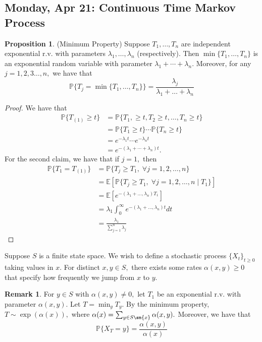 \documentclass[10pt, oneside]{article}
\newcommand{\bbP}{\mathbb{P}}
\newcommand{\bbE}{\mathbb{E}}
\theoremstyle{definition}
\newtheorem{prop}{Proposition}
\newtheorem{rem}{Remark}
\begin{document}
\newpage
\subsection*{Monday, Apr 21: Continuous Time Markov Process}
\begin{prop}
    (Minimum Property) Suppose $T_1, \dots, T_n$ are independent exponential r.v. with parameters $\lambda_1, \dots, \lambda_n$ (respectively). Then $\min\{T_1, \dots, T_n\}$ is an exponential random variable with parameter $\lambda_1 + \cdots + \lambda_n.$ Moreover, for any $j  = 1,2,3\dots, n,$ we have that
    \[\bbP\{T_j = \min\{T_1, \dots, T_n\}\} = \frac{\lambda_j}{\lambda_1 + \dots + \lambda_n}\]
\end{prop} 
\begin{proof}
    We have that 
    \begin{align*}
        \bbP\{T_{(1)}\geq t\} &= \bbP\{T_1, \geq t, T_2 \geq t, \dots , T_n \geq t\}\\
        &= \bbP\{T_1 \geq t\}\cdots \bbP\{T_n \geq t\}\\
        &= e^{-\lambda_1 t}\cdots e^{-\lambda_n t}\\
        &= e^{-(\lambda_1 + \cdots + \lambda_n)t}.
    \end{align*}
    For the second claim, we have that if $j=1,$ then 
    \begin{align*}
        \bbP\{T_1 = T_{(1)}\} &= \bbP\{T_j \geq T_1, \;\forall j = 1,2,\dots, n\}\\
        &= \bbE[\bbP\{T_j \geq T_1, \;\forall j = 1,2,\dots, n \mid T_1\}]\\
        &=  \bbE[e^{-(\lambda_1 + \dots, \lambda_n)T_1}]\\
        &= \lambda_1\int_{0}^\infty e^{-(\lambda_1 + \dots, \lambda_n)t}dt\\
        &= \frac{\lambda_1}{\sum_{j=1}^n\lambda_j}
    \end{align*}
    
\end{proof}

Suppose $S$ is a finite state space. We wish to define a stochastic process $\{X_t\}_{t\geq 0}$ taking values in $x.$ For distinct $x,y \in S,$ there exists some rates $\alpha(x,y) \geq 0 $ that specify how frequently we jump from $x$ to $y$.
\begin{rem}
    For $y \in S$ with $\alpha(x,y) \neq 0,$ let $T_1$ be an exponential r.v. with parameter $\alpha(x,y).$  Let $T = \min_y T_y.$ By the minimum property, $T\sim \exp(\alpha(x)),$ where $\alpha(x) = \sum_{y \in S\sm \{x\}}\alpha(x,y).$ Moreover, we have that 
    \[\bbP\{X_T = y\} = \frac{\alpha(x,y)}{\alpha(x)}\]
\end{rem}
\end{document}
